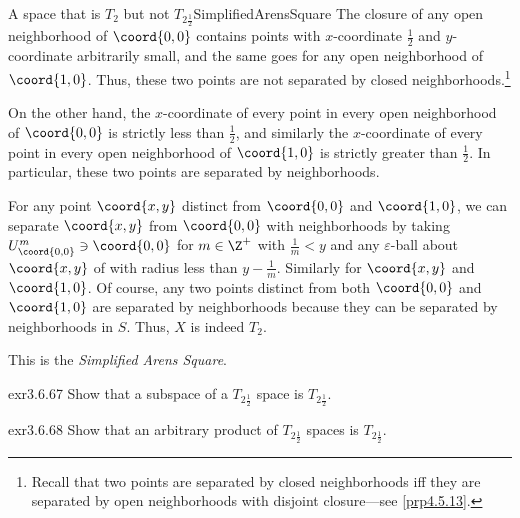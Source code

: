 \begin{exm}{A space that is $T_2$ but not $T_{2\frac{1}{2}}$}{SimplifiedArensSquare}
The closure of any open neighborhood of $\coord{0,0}$ contains points with $x$-coordinate $\frac{1}{2}$ and $y$-coordinate arbitrarily small, and the same goes for any open neighborhood of $\coord{1,0}$.  Thus, these two points are not separated by closed neighborhoods.\footnote{Recall that two points are separated by closed neighborhoods iff they are separated by open neighborhoods with disjoint closure---see \cref{prp4.5.13}.}

On the other hand, the $x$-coordinate of every point in every open neighborhood of $\coord{0,0}$ is strictly less than $\frac{1}{2}$, and similarly the $x$-coordinate of every point in every open neighborhood of $\coord{1,0}$ is strictly greater than $\frac{1}{2}$.  In particular, these two points are separated by neighborhoods.

For any point $\coord{x,y}$ distinct from $\coord{0,0}$ and $\coord{1,0}$, we can separate $\coord{x,y}$ from $\coord{0,0}$ with neighborhoods by taking $U_{\coord{0,0}}^m\ni \coord{0,0}$ for $m\in \Z ^+$ with $\frac{1}{m}<y$ and any $\varepsilon$-ball about $\coord{x,y}$ of with radius less than $y-\frac{1}{m}$.  Similarly for $\coord{x,y}$ and $\coord{1,0}$.  Of course, any two points distinct from both $\coord{0,0}$ and $\coord{1,0}$ are separated by neighborhoods because they can be separated by neighborhoods in $S$.  Thus, $X$ is indeed $T_2$.
\begin{rmk}
This is the \emph{Simplified Arens Square}.
\end{rmk}
\end{exm}
\begin{exr}{}{exr3.6.67}
Show that a subspace of a $T_{2\frac{1}{2}}$ space is $T_{2\frac{1}{2}}$.
\end{exr}
\begin{exr}{}{exr3.6.68}
Show that an arbitrary product of $T_{2\frac{1}{2}}$ spaces is $T_{2\frac{1}{2}}$.
\end{exr}

